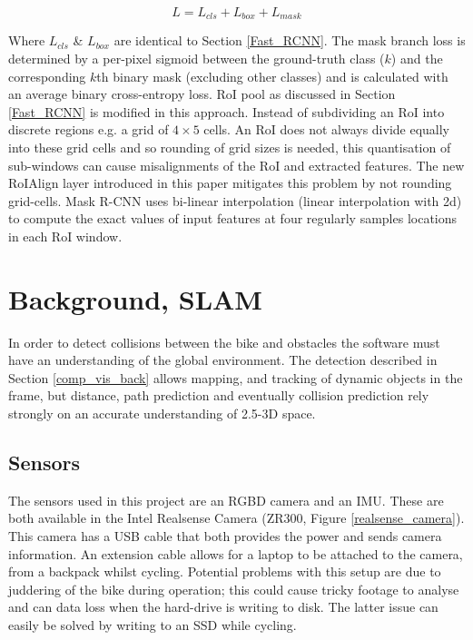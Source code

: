 \documentclass[a4paper,11pt,notitlepage]{article}
\begin{document}
\begin{equation}
\label{maskrcnnloss}
L = L_{cls} + L_{box} + L_{mask}
\end{equation}

Where $L_{cls}$ \& $L_{box}$ are identical to Section \ref{Fast_RCNN}. The mask branch loss is determined by a per-pixel sigmoid between the ground-truth class ($k$) and the corresponding $k$th binary mask (excluding other classes) and is calculated with an average binary cross-entropy loss.
\newline \newline
RoI pool as discussed in Section \ref{Fast_RCNN} is modified in this approach. Instead of subdividing an RoI into discrete regions e.g. a grid of $4 \times 5$ cells. An RoI does not always divide equally into these grid cells and so rounding of grid sizes is needed, this quantisation of sub-windows can cause misalignments of the RoI and extracted features. The new RoIAlign layer introduced in this paper mitigates this problem by not rounding grid-cells. Mask R-CNN uses bi-linear interpolation (linear interpolation with 2d) to compute the exact values of input features at four regularly samples locations in each RoI window.

\section{Background, SLAM} \label{back_slam}
In order to detect collisions between the bike and obstacles the software must have an understanding of the global environment. The detection described in Section \ref{comp_vis_back} allows mapping, and tracking of dynamic objects in the frame, but distance, path prediction and eventually collision prediction rely strongly on an accurate understanding of 2.5-3D space.

\subsection{Sensors}
The sensors used in this project are an RGBD camera and an IMU. These are both available in the Intel Realsense Camera (ZR300, Figure \ref{realsense_camera}). This camera has a USB cable that both provides the power and sends camera information. An extension cable allows for a laptop to be attached to the camera, from a backpack whilst cycling. Potential problems with this setup are due to juddering of the bike during operation; this could cause tricky footage to analyse and can data loss when the hard-drive is writing to disk. The latter issue can easily be solved by writing to an SSD while cycling.
\end{document}

